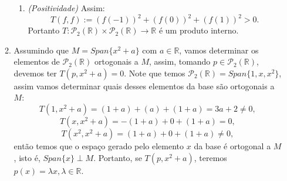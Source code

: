 \documentclass{article}
\begin{document}
\begin{enumerate}
\begin{enumerate}
\begin{enumerate}
						\item \textit{(Positividade)} Assim:
						$$
						T(f,f) := (f(-1))^{2} + (f(0))^{2}+ (f(1))^{2}>0.
						$$
						Portanto $T: \mathcal{P}_{2}(\mathbb{R}) \times \mathcal{P}_{2}(\mathbb{R}) \to \mathbb{R}$ é um produto interno.
					\end{enumerate}
					
					\item Assumindo que $M = Span\{x^{2}+a\}$ com $a \in \mathbb{R}$, vamos determinar os elementos de $\mathcal{P}_{2}(\mathbb{R})$ ortogonais a $M$, assim, tomando $p \in \mathcal{P}_{2}(\mathbb{R})$, devemos ter $T(p, x^{2}+a)=0$. Note que temos $\mathcal{P}_{2}(\mathbb{R}) = Span\{1, x, x^{2}\}$, assim vamos determinar quais desses elementos da base são ortogonais a $M$:
					$$
					T(1, x^{2}+a) = (1+a)+(a)+(1+a)= 3a+2 \neq 0,
					$$
					$$
					T(x, x^{2}+a) = -(1+a)+0+(1+a)=0,
					$$
					$$
					T(x^{2}, x^{2}+a) = (1+a)+0+(1+a) \neq 0,
					$$
					então temos que o espaço gerado pelo elemento $x$ da base é ortogonal a $M$, isto é, $Span\{x\}\perp M$. Portanto, se $T(p, x^{2}+a)$, teremos $p(x)=\lambda x, \lambda \in \mathbb{R}$.
				
					
			\end{enumerate}
		
		
	\end{enumerate}
		
\end{document}
